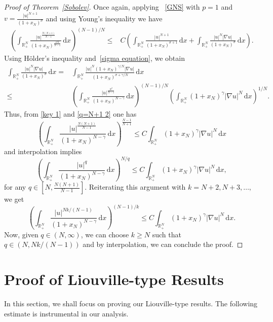 \documentclass[12pt,reqno]{amsart}
\begin{document}
\begin{proof}[Proof of Theorem~\ref{Sobolev}]
		Once again, applying ~\eqref{GNS} with $p=1$ and $v=\frac{|u|^{N+1}}{(1+x_N)^{\sigma}}$ and using Young's inequality we have
		\begin{align*}
			\left(\int_{\mathds{R}^{N}_+}\frac{|u|^{\frac{N(N+1)}{N-1}}}{(1+x_N)^{\frac{\sigma N}{N-1}}}\, \mathrm{d} x\right)^{(N-1)/N} \leq&C\left(\int_{\mathds{R}^{N}_+}\frac{|u|^{N+1}}{(1+x_N)^{\sigma+1}}\, \mathrm{d} x +\int_{\mathds{R}^{N}_+}\frac{|u|^N|\nabla u|}{(1+x_N)^{\sigma}}\, \mathrm{d} x\right).
		\end{align*}
		Using H\"{o}lder's inequality and~\eqref{sigma equation}, we obtain
		\begin{align*}
			\int_{\mathds{R}^{N}_+}\frac{|u|^{N}|\nabla u|}{(1+x_N)^{\sigma}}\, \mathrm{d} x=&\int_{\mathds{R}^{N}_+}\frac{|u|^{N}(1+x_N)^{\gamma/N}|\nabla u|}{(1+x_N)^{\sigma+\gamma/N}}\, \mathrm{d} x\\
			\leq&\left(\int_{\mathds{R}^{N}_+}\frac{|u|^{\frac{N^2}{N-1}}}{(1+x_N)^{N-\gamma}}\, \mathrm{d} x\right)^{(N-1)/N}\left(\int_{\mathds{R}^{N}_+}(1+x_N)^{\gamma}|\nabla u|^N\, \mathrm{d} x\right)^{1/N}.
		\end{align*}
		Thus, from \eqref{key 1} and \eqref{q=N+1 2} one has
		\begin{equation*}
			\left(\int_{\mathds{R}^{N}_+}\frac{|u|^{\frac{N(N+1)}{N-1}}}{(1+x_N)^{N-\gamma}}\, \mathrm{d} x\right)^\frac{N-1}{N+1}\leq C \int_{\mathds{R}^{N}_+}(1+x_N)^{\gamma}|\nabla u|^N\, \mathrm{d} x
		\end{equation*}
		and interpolation implies
		\begin{equation*}
			\left(\int_{\mathds{R}^{N}_+}\frac{|u|^q}{(1+x_N)^{N-\gamma}}\, \mathrm{d} x\right)^{N/q}\leq C \int_{\mathds{R}^{N}_+}(1+x_N)^{\gamma}|\nabla u|^N\, \mathrm{d} x,
		\end{equation*}
		for any $q \in[N,\frac{N(N+1)}{N-1}]$. Reiterating this argument with $k=N+2,N+3,\ldots,$ we get
		\[
		\left(\int_{\mathds{R}^{N}_+}\frac{|u|^{Nk/(N-1)}}{(1+x_N)^{N-\gamma}}\, \mathrm{d} x\right)^{(N-1)/k} \leq C\int_{\mathds{R}^{N}_+}(1+x_N)^\gamma|\nabla u|^N\, \mathrm{d} x.
		\]
		Now, given $q\in (N,\infty)$, we can choose $k\geq N$ such that $q \in(N,Nk/(N-1))$ and by interpolation, we can conclude the proof.
	\end{proof}
	\section{Proof of Liouville-type Results}
In this section, we shall focus on proving our Liouville-type results. The following estimate is instrumental in our analysis.
\end{document}
